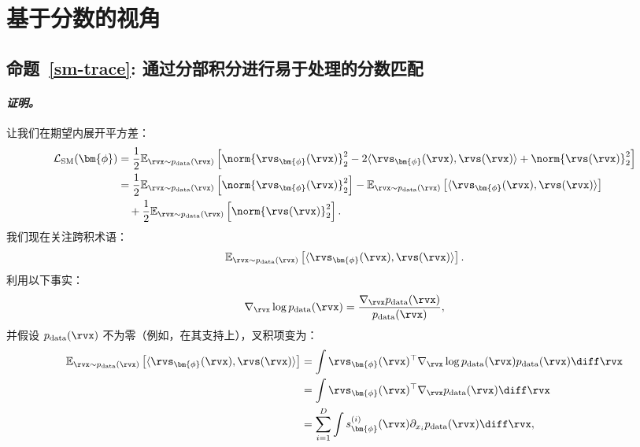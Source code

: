 \section{基于分数的视角}\label{app-sec:score-proof}

\subsection{命题~\ref{sm-trace}: 通过分部积分进行易于处理的分数匹配}\label{app-sec:sm-trace}
\paragraph{\textit{证明。}}

        让我们在期望内展开平方差：
        \begin{align*}
        \mathcal{L}_{\text{SM}}(\bm{\phi}) &= \frac{1}{2}\mathbb{E}_{\rvx \sim p_{\text{data}}(\rvx)} \left[ \norm{\rvs_{\bm{\phi}}(\rvx)}_2^2 - 2 \langle \rvs_{\bm{\phi}}(\rvx), \rvs(\rvx) \rangle + \norm{\rvs(\rvx)}_2^2 \right] \\
        &= \frac{1}{2}\mathbb{E}_{\rvx \sim p_{\text{data}}(\rvx)} \left[ \norm{\rvs_{\bm{\phi}}(\rvx)}_2^2 \right] - \mathbb{E}_{\rvx \sim p_{\text{data}}(\rvx)} \left[ \langle \rvs_{\bm{\phi}}(\rvx), \rvs(\rvx) \rangle \right] \\
        &\quad + \frac{1}{2}\mathbb{E}_{\rvx \sim p_{\text{data}}(\rvx)} \left[ \norm{\rvs(\rvx)}_2^2 \right].
        \end{align*}
        我们现在关注跨积术语：
        \[
        \mathbb{E}_{\rvx \sim p_{\text{data}}(\rvx)} \left[ \langle \rvs_{\bm{\phi}}(\rvx), \rvs(\rvx) \rangle \right].
        \]
        利用以下事实：
        \[
        \nabla_{\rvx} \log p_{\text{data}}(\rvx) = \frac{\nabla_{\rvx}p_{\text{data}}(\rvx)}{p_{\text{data}}(\rvx)},
        \]
        并假设 $p_{\text{data}}(\rvx)$ 不为零（例如，在其支持上），叉积项变为：
        \begin{align*}
            \mathbb{E}_{\rvx \sim p_{\text{data}}(\rvx)} \left[ \langle \rvs_{\bm{\phi}}(\rvx), \rvs(\rvx) \rangle \right]
             &= \int \rvs_{\bm{\phi}}(\rvx)^\top  \nabla_{\rvx} \log p_{\text{data}}(\rvx) p_{\text{data}}(\rvx) \diff \rvx \\
             &= \int \rvs_{\bm{\phi}}(\rvx)^\top  \nabla_{\rvx}p_{\text{data}}(\rvx) \diff \rvx \\
             &= \sum_{i=1}^{D} \int  s_{\bm{\phi}}^{(i)}(\rvx) \partial_{x_i}p_{\text{data}}(\rvx) \diff \rvx,
        \end{align*}
